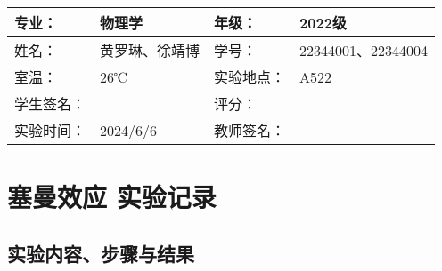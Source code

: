 \documentclass[dvipsnames, svgnames,a4paper,11pt]{article}
\begin{document}
	\begin{table}
		\renewcommand\arraystretch{1.7}
		\centering
		\begin{tabularx}{\textwidth}{|X|X|X|X|}
			\hline
			专业： & 物理学 & 年级： & 2022级 \\
			\hline
			姓名： & 黄罗琳、徐靖博 & 学号： & 22344001、22344004\\
			\hline
			室温： & 26℃ & 实验地点： & A522 \\
			\hline
			学生签名：&  & 评分： &\\
			\hline
			实验时间：& 2024/6/6 & 教师签名：&\\
			\hline
		\end{tabularx}
	\end{table}
	
	\section{塞曼效应 \quad\heiti 实验记录}
	
	\subsection{实验内容、步骤与结果}
	
\end{document}
